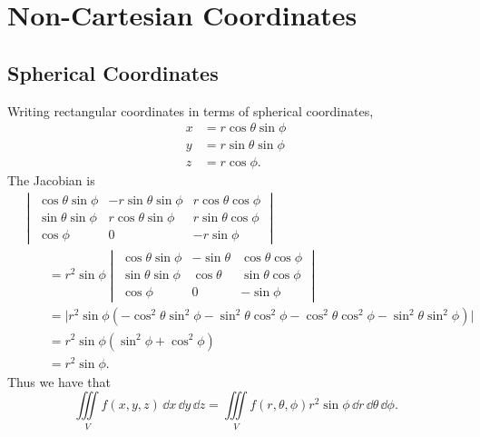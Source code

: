 \flushbottom




\chapter{Non-Cartesian Coordinates}










\section{Spherical Coordinates}
Writing rectangular coordinates in terms of spherical coordinates,
\begin{align*}
  x &= r \cos \theta \sin \phi \\
  y &= r \sin \theta \sin \phi \\
  z &= r \cos \phi.
\end{align*}
The Jacobian is
\begin{align*}
  &\begin{vmatrix}
    \cos\theta\sin\phi      & -r\sin\theta\sin\phi  & r\cos\theta\cos\phi \\
    \sin\theta\sin\phi      & r\cos\theta\sin\phi   & r\sin\theta\cos\phi \\
    \cos\phi                & 0                     & -r \sin \phi
  \end{vmatrix} \\
  &\qquad = r^2 \sin\phi
  \begin{vmatrix}
    \cos\theta\sin\phi      & -\sin\theta   & \cos\theta\cos\phi \\
    \sin\theta\sin\phi      & \cos\theta    & \sin\theta\cos\phi \\
    \cos\phi                & 0             & - \sin \phi
  \end{vmatrix} \\
  &\qquad = \big|r^2 \sin\phi(-\cos^2\theta\sin^2\phi - \sin^2\theta\cos^2\phi
  -\cos^2\theta\cos^2\phi - \sin^2\theta \sin^2\phi) \big| \\
  &\qquad = r^2 \sin\phi(\sin^2\phi + \cos^2\phi) \\
  &\qquad = r^2 \sin\phi.
\end{align*}
Thus we have that
\[ \iiint\limits_V f(x,y,z) \,\dd x\,\dd y\,\dd z
= \iiint\limits_V f(r,\theta,\phi)r^2 \sin\phi\,\dd r\,\dd \theta\,\dd \phi.\]




